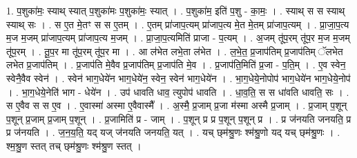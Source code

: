 \documentclass[17pt]{extarticle}
\begin{document}
1. प॒शुका॑मः॒ स्याथ् स्यात् प॒शुका॑मः प॒शुका॑मः॒ स्यात् । . प॒शुका॑म॒ इति॑ प॒शु - का॒मः॒ । . स्याथ् स स स्याथ् स्याथ् सः । . स ए॒त मे॒तꣳ स स ए॒तम् । . ए॒तम् प्रा॑जाप॒त्यम् प्रा॑जाप॒त्य मे॒त मे॒तम् प्रा॑जाप॒त्यम् । . प्रा॒जा॒प॒त्य म॒ज म॒जम् प्रा॑जाप॒त्यम् प्रा॑जाप॒त्य म॒जम् । . प्रा॒जा॒प॒त्यमिति॑ प्राजा - प॒त्यम् । . अ॒जम् तू॑प॒रम् तू॑प॒र म॒ज म॒जम् तू॑प॒रम् । . तू॒प॒र मा तू॑प॒रम् तू॑प॒र मा । . आ ल॑भेत लभे॒ता ल॑भेत । . ल॒भे॒त॒ प्र॒जाप॑तिम् प्र॒जाप॑तिम् ॅलभेत लभेत प्र॒जाप॑तिम् । . प्र॒जाप॑ति मे॒वैव प्र॒जाप॑तिम् प्र॒जाप॑ति मे॒व । . प्र॒जाप॑ति॒मिति॑ प्र॒जा - प॒ति॒म् । . ए॒व स्वेन॒ स्वेनै॒वैव स्वेन॑ । . स्वेन॑ भाग॒धेये॑न भाग॒धेये॑न॒ स्वेन॒ स्वेन॑ भाग॒धेये॑न । . भा॒ग॒धेये॒नोपोप॑ भाग॒धेये॑न भाग॒धेये॒नोप॑ । . भा॒ग॒धेये॒नेति॑ भाग - धेये॑न । . उप॑ धावति धाव॒ त्युपोप॑ धावति । . धा॒व॒ति॒ स स धा॑वति धावति॒ सः । . स ए॒वैव स स ए॒व । . ए॒वास्मा॑ अस्मा ए॒वैवास्मै᳚ । . अ॒स्मै॒ प्र॒जाम् प्र॒जा म॑स्मा अस्मै प्र॒जाम् । . प्र॒जाम् प॒शून् प॒शून् प्र॒जाम् प्र॒जाम् प॒शून् । . प्र॒जामिति॑ प्र - जाम् । . प॒शून् प्र प्र प॒शून् प॒शून् प्र । . प्र ज॑नयति जनयति॒ प्र प्र ज॑नयति । . ज॒न॒य॒ति॒ यद् यज् ज॑नयति जनयति॒ यत् । . यच् छ्‌म॑श्रु॒णः श्म॑श्रु॒णो यद् यच् छ्‌म॑श्रु॒णः । . श्म॒श्रु॒ण स्तत् तच् छ्‌म॑श्रु॒णः श्म॑श्रु॒ण स्तत् । \newline
\end{document}
